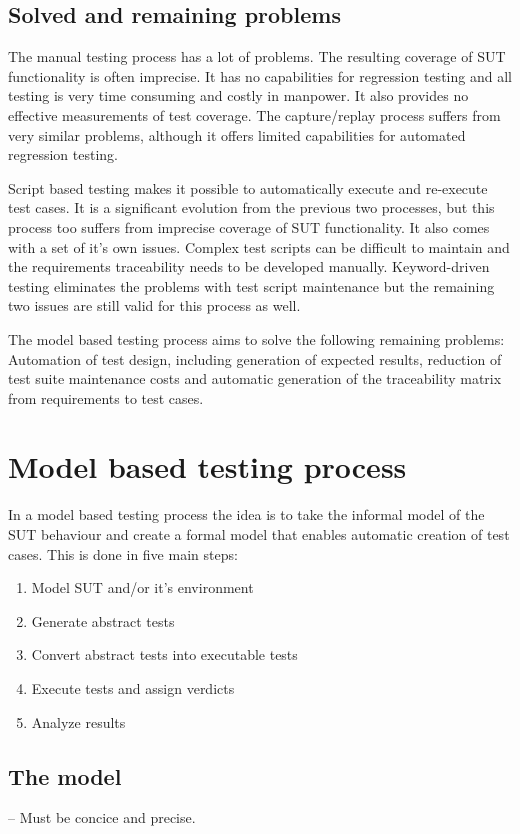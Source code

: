 \subsection{Solved and remaining problems}
The manual testing process has a lot of problems. The resulting coverage of SUT functionality is often imprecise. It has no capabilities for regression testing and all testing is very time consuming and costly in manpower. It also provides no effective measurements of test coverage. The capture/replay process suffers from very similar problems, although it offers limited capabilities for automated regression testing.

Script based testing makes it possible to automatically execute and re-execute test cases. It is a significant evolution from the previous two processes, but this process too suffers from imprecise coverage of SUT functionality. It also comes with a set of it's own issues. Complex test scripts can be difficult to maintain and the requirements traceability needs to be developed manually. Keyword-driven testing eliminates the problems with test script maintenance but the remaining two issues are still valid for this process as well.

The model based testing process aims to solve the following remaining problems: Automation of test design, including generation of expected results, reduction of test suite maintenance costs and automatic generation of the traceability matrix from requirements to test cases.

\section{Model based testing process}
In a model based testing process the idea is to take the informal model of the SUT behaviour and create a formal model that enables automatic creation of test cases. This is done in five main steps:
\begin{enumerate}
	\item Model SUT and/or it's environment
	\item Generate abstract tests
	\item Convert abstract tests into executable tests
	\item Execute tests and assign verdicts
	\item Analyze results
\end{enumerate}


\subsection{The model}
-- Must be concice and precise. 


